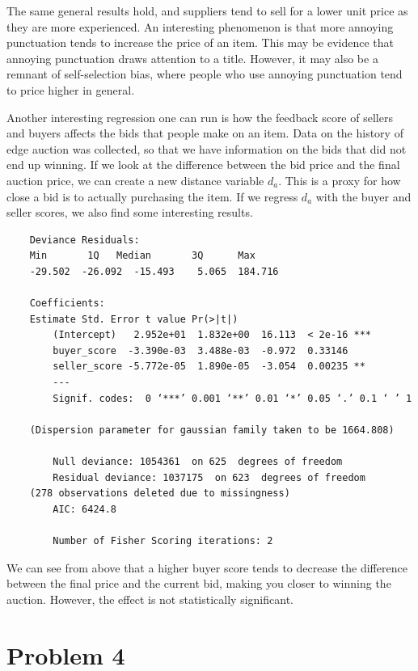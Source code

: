 \documentclass[psamsfonts]{amsart}
\begin{document}
The same general results hold, and suppliers tend to sell for a lower unit price as they are more experienced. An interesting phenomenon is that more annoying punctuation tends to increase the price of an item. This may be evidence that annoying punctuation draws attention to a title. However, it may also be a remnant of self-selection bias, where people who use annoying punctuation tend to price higher in general.

Another interesting regression one can run is how the feedback score of sellers and buyers affects the bids that people make on an item. Data on the history of edge auction was collected, so that we have information on the bids that did not end up winning. If we look at the difference between the bid price and the final auction price, we can create a new distance variable $d_a$. This is a proxy for how close a bid is to actually purchasing the item. If we regress $d_a$ with the buyer and seller scores, we also find some interesting results. 

\begin{verbatim}
    Deviance Residuals: 
    Min       1Q   Median       3Q      Max  
    -29.502  -26.092  -15.493    5.065  184.716  

    Coefficients:
    Estimate Std. Error t value Pr(>|t|)    
        (Intercept)   2.952e+01  1.832e+00  16.113  < 2e-16 ***
        buyer_score  -3.390e-03  3.488e-03  -0.972  0.33146    
        seller_score -5.772e-05  1.890e-05  -3.054  0.00235 ** 
        ---
        Signif. codes:  0 ‘***’ 0.001 ‘**’ 0.01 ‘*’ 0.05 ‘.’ 0.1 ‘ ’ 1 

    (Dispersion parameter for gaussian family taken to be 1664.808)

        Null deviance: 1054361  on 625  degrees of freedom
        Residual deviance: 1037175  on 623  degrees of freedom
    (278 observations deleted due to missingness)
        AIC: 6424.8

        Number of Fisher Scoring iterations: 2
\end{verbatim}

We can see from above that a higher buyer score tends to decrease the difference between the final price and the current bid, making you closer to winning the auction. However, the effect is not statistically significant. 

\section{Problem 4}
\end{document}

